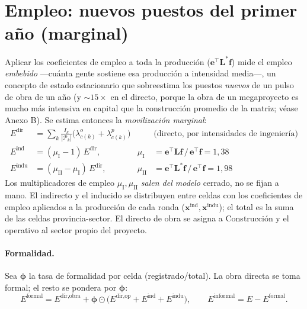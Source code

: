 \documentclass[11pt]{article}
\begin{document}
\section{Empleo: nuevos puestos del primer año (marginal)}
Aplicar los coeficientes de empleo a toda la producción ($\mathbf{e}^{\top}\mathbf{L}^{\ast}\mathbf{f}$) mide el empleo \emph{embebido} —cuánta gente sostiene esa producción a intensidad media—, un concepto de estado estacionario que sobreestima los puestos \emph{nuevos} de un pulso de obra de un año (y $\sim\!15\times$ en el directo, porque la obra de un megaproyecto es mucho más intensiva en capital que la construcción promedio de la matriz; véase Anexo B). Se estima entonces la \emph{movilización marginal}:
\begin{align}
E^{\text{dir}} &= \sum_k \tfrac{I_k}{|\mathcal{P}_k|}\big(\lambda^{o}_{c(k)}+\lambda^{p}_{c(k)}\big) && \text{(directo, por intensidades de ingeniería)}\\
E^{\text{ind}} &= (\mu_{\mathrm{I}}-1)\,E^{\text{dir}}, & \mu_{\mathrm{I}}&=\mathbf{e}^{\top}\mathbf{L}\mathbf{f}\,/\,\mathbf{e}^{\top}\mathbf{f}=1{,}38\\
E^{\text{indu}} &= (\mu_{\mathrm{II}}-\mu_{\mathrm{I}})\,E^{\text{dir}}, & \mu_{\mathrm{II}}&=\mathbf{e}^{\top}\mathbf{L}^{\ast}\mathbf{f}\,/\,\mathbf{e}^{\top}\mathbf{f}=1{,}98
\end{align}
Los multiplicadores de empleo $\mu_{\mathrm{I}},\mu_{\mathrm{II}}$ \emph{salen del modelo} cerrado, no se fijan a mano. El indirecto y el inducido se distribuyen entre celdas con los coeficientes de empleo aplicados a la producción de cada ronda ($\mathbf{x}^{\text{ind}},\mathbf{x}^{\text{indu}}$); el total es la suma de las celdas provincia-sector. El directo de obra se asigna a Construcción y el operativo al sector propio del proyecto.

\paragraph{Formalidad.} Sea $\boldsymbol{\phi}$ la tasa de formalidad por celda (registrado/total). La obra directa se toma formal; el resto se pondera por $\boldsymbol{\phi}$:
\begin{equation}
E^{\text{formal}} = E^{\text{dir,obra}} + \boldsymbol{\phi}\odot\big(E^{\text{dir,op}}+E^{\text{ind}}+E^{\text{indu}}\big),\qquad
E^{\text{informal}}=E-E^{\text{formal}}.
\end{equation}
\end{document}
